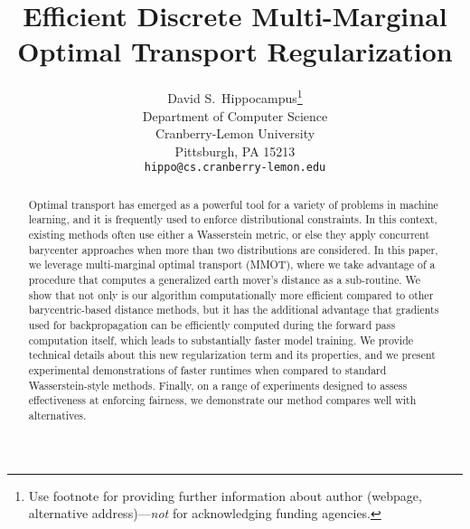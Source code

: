 \documentclass{article} %
\title{Efficient Discrete Multi-Marginal \\ Optimal Transport Regularization}
\author{%
  David S.~Hippocampus\thanks{Use footnote for providing further information
    about author (webpage, alternative address)---\emph{not} for acknowledging
    funding agencies.} \\
  Department of Computer Science\\
  Cranberry-Lemon University\\
  Pittsburgh, PA 15213 \\
  \texttt{hippo@cs.cranberry-lemon.edu} \\
}
\theoremstyle{plain}
\theoremstyle{definition}
\theoremstyle{remark}
\newcommand{\authnote}[3]{\textcolor{#2}{\textbf{#1:} #3}}
\newcommand{\glenn}[1]{{\authnote{Glenn}{blue}{#1}}}
\begin{document}
\maketitle
\begin{abstract}
Optimal transport has emerged as a powerful tool for a variety of problems in machine learning, and it is frequently used to enforce distributional constraints.
In this context, existing methods often use either a Wasserstein metric, or else they apply concurrent barycenter approaches when more than two distributions are considered.
In this paper, we  leverage multi-marginal optimal transport (MMOT), where we take advantage of a procedure that computes a generalized earth mover's distance as a sub-routine. 
We show that not only is our algorithm computationally more efficient compared to other barycentric-based distance methods, but it has the additional advantage that gradients used for backpropagation can be efficiently computed during the forward pass computation itself, which leads to substantially faster model training. We provide technical details about this new regularization term and its properties, and we present experimental demonstrations of faster runtimes when compared to standard Wasserstein-style methods. Finally, on a range of experiments designed to assess effectiveness at enforcing fairness, we demonstrate our method  compares well with alternatives.

\end{abstract}
\end{document}
